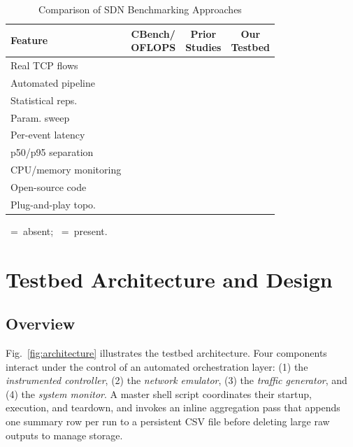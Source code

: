 \documentclass[conference]{IEEEtran}
\newcommand{\cmark}{\ding{51}}
\newcommand{\xmark}{\ding{55}}
\begin{document}
\begin{table}[t]
\centering
\caption{Comparison of SDN Benchmarking Approaches}
\label{tab:comparison}
\renewcommand{\arraystretch}{1.15}
\begin{tabular}{lccc}
\toprule
\textbf{Feature} &
\makecell{\textbf{CBench/}\\\textbf{OFLOPS}} &
\makecell{\textbf{Prior}\\\textbf{Studies}} &
\makecell{\textbf{Our}\\\textbf{Testbed}} \\
\midrule
Real TCP flows          & \xmark & \cmark & \cmark \\
Automated pipeline      & \xmark & \xmark & \cmark \\
Statistical reps.       & \xmark & \xmark & \cmark \\
Param. sweep            & \xmark & \xmark & \cmark \\
Per-event latency       & \xmark & \xmark & \cmark \\
p50/p95 separation      & \xmark & \xmark & \cmark \\
CPU/memory monitoring   & \xmark & \xmark & \cmark \\
Open-source code        & \cmark & \xmark & \cmark \\
Plug-and-play topo.     & \xmark & \xmark & \cmark \\
\bottomrule
\end{tabular}
\vspace{1pt}
{\footnotesize \xmark~=~absent; \cmark~=~present.}
\end{table}

\section{Testbed Architecture and Design}
\label{sec:design}

\subsection{Overview}

Fig.~\ref{fig:architecture} illustrates the testbed architecture.
Four components interact under the control of an automated
orchestration layer: (1) the \emph{instrumented controller},
(2) the \emph{network emulator}, (3) the \emph{traffic generator},
and (4) the \emph{system monitor}. A master shell script
coordinates their startup, execution, and teardown, and invokes
an inline aggregation pass that appends one summary row per run
to a persistent CSV file before deleting large raw outputs
to manage storage.
\end{document}
